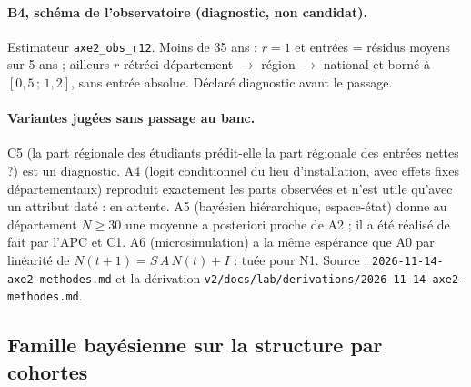 \paragraph{B4, schéma de l'observatoire (diagnostic, non candidat).} Estimateur \texttt{axe2\_obs\_r12}.
Moins de 35 ans : $r = 1$ et entrées = résidus moyens sur 5 ans ; ailleurs $r$ rétréci
département $\to$ région $\to$ national et borné à $[0{,}5\,;\,1{,}2]$, sans entrée absolue. Déclaré
diagnostic avant le passage.

\paragraph{Variantes jugées sans passage au banc.} C5 (la part régionale des étudiants prédit-elle la part
régionale des entrées nettes ?) est un diagnostic. A4 (logit conditionnel du lieu d'installation, avec effets
fixes départementaux) reproduit exactement les parts observées\derive{} et n'est utile qu'avec un attribut
daté : en attente. A5 (bayésien hiérarchique, espace-état) donne au département $N \ge 30$ une moyenne a
posteriori proche de A2\derive{} ; il a été réalisé de fait par l'APC et C1. A6 (microsimulation) a la
même espérance que A0 par linéarité de $N(t+1) = S\,A\,N(t) + I$\derive{} : tuée pour N1. Source :
\texttt{2026-11-14-axe2-methodes.md} et la dérivation \texttt{v2/docs/lab/derivations/2026-11-14-axe2-methodes.md}.

\subsection{Famille bayésienne sur la structure par cohortes}
\label{met:bayes}

